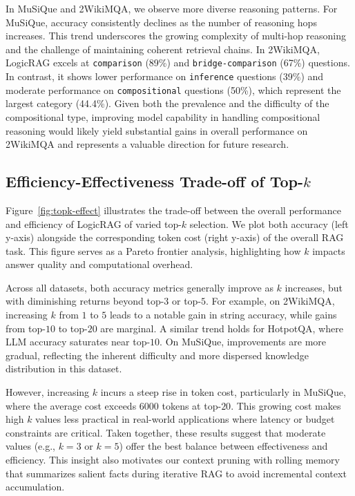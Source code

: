 \documentclass[letterpaper]{article} %
\begin{document}
In MuSiQue and 2WikiMQA, we observe more diverse reasoning patterns. For MuSiQue, accuracy consistently declines as the number of reasoning hops increases. This trend underscores the growing complexity of multi-hop reasoning and the challenge of maintaining coherent retrieval chains. In 2WikiMQA, LogicRAG excels at \texttt{comparison} (89\%) and \texttt{bridge-comparison} (67\%) questions. In contrast, it shows lower performance on \texttt{inference} questions (39\%) and moderate performance on \texttt{compositional} questions (50\%), which represent the largest category (44.4\%). Given both the prevalence and the difficulty of the compositional type, improving model capability in handling compositional reasoning would likely yield substantial gains in overall performance on 2WikiMQA and represents a valuable direction for future research.







\subsection{Efficiency-Effectiveness Trade-off of Top-$k$}

Figure~\ref{fig:topk-effect} illustrates the trade-off between the overall performance and efficiency of LogicRAG of varied top-$k$ selection. We plot both accuracy (left y-axis) alongside the corresponding token cost (right y-axis) of the overall RAG task. This figure serves as a Pareto frontier analysis, highlighting how $k$ impacts answer quality and computational overhead.

Across all datasets, both accuracy metrics generally improve as $k$ increases, but with diminishing returns beyond top-$3$ or top-$5$. For example, on 2WikiMQA, increasing $k$ from $1$ to $5$ leads to a notable gain in string accuracy, while gains from top-$10$ to top-$20$ are marginal. A similar trend holds for HotpotQA, where LLM accuracy saturates near top-$10$. On MuSiQue, improvements are more gradual, reflecting the inherent difficulty and more dispersed knowledge distribution in this dataset.

However, increasing $k$ incurs a steep rise in token cost, particularly in MuSiQue, where the average cost exceeds 6000 tokens at top-$20$. This growing cost makes high $k$ values less practical in real-world applications where latency or budget constraints are critical. Taken together, these results suggest that moderate values (e.g., $k=3$ or $k=5$) offer the best balance between effectiveness and efficiency. This insight also motivates our context pruning with rolling memory that summarizes salient facts during iterative RAG to avoid incremental context accumulation.
\end{document}
